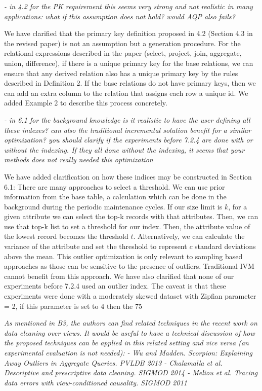 \noindent\emph{- in 4.2 for the PK requirement  this seems very strong and not realistic in many applications: what if this assumption does not hold? would AQP also fails?}

We have clarified that the primary key definition proposed in 4.2 (Section 4.3 in the revised paper) is not an assumption but a generation procedure. For the relational expressions described in the paper (select, project, join, aggregate, union, difference), if there is a unique primary key for the base relations, we can ensure that any derived relation also has a unique primary key by the rules described in Definition 2. If the base relations do not have primary keys, then we can add an extra column to the relation that assigns each row a unique id. We added Example 2 to describe this process concretely.

\noindent\emph{- in 6.1 for the background knowledge is it realistic to have the user defining all these indexes? can also the traditional incremental solution benefit for a similar optimization? you should clarify if the experiments before 7.2.4 are done with or without the indexing. If they all done without the indexing, it seems that your methods does not really needed this optimization}

We have added clarification on how these indices may be constructed in Section 6.1:
There are many approaches to select a threshold. We can use prior information from the base table, a calculation which can be done in the background during the periodic maintenance cycles. If our size limit is $k$, for a given attribute we can select the top-k records with that attributes. Then, we can use that top-k list to set a threshold for our index.  Then, the attribute value of the lowest record becomes the threshold $t$. Alternatively, we can calculate the variance of the attribute and set the threshold to represent $c$ standard deviations above the mean.
This outlier optimization is only relevant to sampling based approaches as those can be sensitive to the presence of outliers. Traditional IVM cannot benefit from this approach. 
We have also clarified that none of our experiments before 7.2.4 used an outlier index. The caveat is that these experiments were done with a moderately skewed dataset with Zipfian parameter = 2, if this parameter is set to 4 then the 75%

\vspace{1em}
\emph{As mentioned in B3, the authors can find related techniques in the recent work on data cleaning over views. It would be useful to have a technical discussion of how the proposed techniques can be applied in this related setting and vice versa (an experimental evaluation is not needed):
- Wu and Madden. Scorpion: Explaining Away Outliers in Aggregate Queries. PVLDB 2013
- Chalamalla et al. Descriptive and prescriptive data cleaning. SIGMOD 2014
- Meliou et al. Tracing data errors with view-conditioned causality. SIGMOD 2011}

